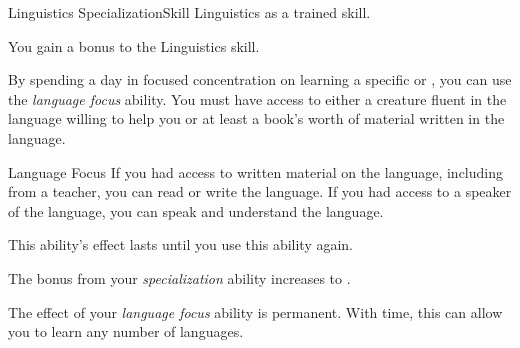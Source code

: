     \begin{feat}{Linguistics Specialization}{Skill}
        \featpre Linguistics as a trained skill.

         You gain a  bonus to the Linguistics skill.

         By spending a day in focused concentration on learning a specific  or , you can use the \textit{language focus} ability.
        You must have access to either a creature fluent in the language willing to help you or at least a book's worth of material written in the language.
        \begin{activeability}{Language Focus}
            \rankline
            If you had access to written material on the language, including from a teacher, you can read or write the language.
            If you had access to a speaker of the language, you can speak and understand the language.

            This ability's effect lasts until you use this ability again.
        \end{activeability}

         The bonus from your \textit{specialization} ability increases to .

         The effect of your \textit{language focus} ability is permanent.
        With time, this can allow you to learn any number of languages.
    \end{feat}

